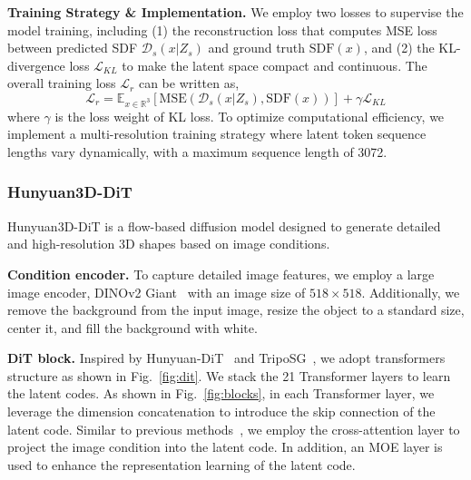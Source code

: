\textbf{Training Strategy \& Implementation.}  We employ two losses to supervise the model training, including (1) the reconstruction loss that computes MSE loss between predicted SDF $\mathcal{D}_s (x | Z_s)$ and ground truth $\mathrm{SDF}(x)$, and (2) the KL-divergence loss $\mathcal{L}_{KL}$ to make the latent space compact and continuous. The overall training loss $\mathcal{L}_r$ can be written as,
\begin{equation}
    \mathcal{L}_r = \mathbb{E}_{ x \in \mathbb{R}^3 } [ \mathrm{MSE} ( \mathcal{D}_s (x | Z_s), \mathrm{SDF}(x) ) ] + \gamma \mathcal{L}_{KL}
\end{equation}
where $\gamma$ is the loss weight of KL loss.
To optimize computational efficiency, we implement a multi-resolution training strategy where latent token sequence lengths vary dynamically, with a maximum sequence length of 3072. 


\subsubsection{Hunyuan3D-DiT}
\label{subsubsec:dit}
Hunyuan3D-DiT is a flow-based diffusion model designed to generate detailed and high-resolution 3D shapes based on image conditions.

\textbf{Condition encoder.} To capture detailed image features, we employ a large image encoder, DINOv2 Giant~\cite{oquab2023dinov2} with an image size of $518 \times 518$. Additionally, we remove the background from the input image, resize the object to a standard size, center it, and fill the background with white.

\textbf{DiT block.} Inspired by Hunyuan-DiT~\cite{li2024hunyuandit} and TripoSG~\cite{li2025triposg}, we adopt transformers structure as shown in Fig.~\ref{fig:dit}. We stack the 21 Transformer layers to learn the latent codes. As shown in Fig.~\ref{fig:blocks}, in each Transformer layer, we leverage the dimension concatenation to introduce the skip connection of the latent code. Similar to previous methods~\cite{zhang2024clay, li2024craftsman}, we employ the cross-attention layer to project the image condition into the latent code. In addition, an MOE layer is used to enhance the representation learning of the latent code.






